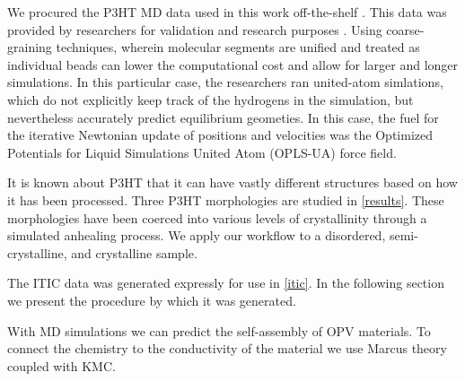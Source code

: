 We procured the P3HT MD data used in this work off-the-shelf \cite{P3HTData}. 
This data was provided by researchers for validation and research purposes \cite{Miller2018}. 
Using coarse-graining techniques, wherein molecular segments are unified and treated as individual beads can lower the computational cost and allow for larger and longer simulations. 
In this particular case, the researchers ran united-atom simlations, which do
not explicitly keep track of the hydrogens in the simulation, but nevertheless accurately predict equilibrium geometies. 
In this case, the fuel for the iterative Newtonian update of positions and velocities was the Optimized Potentials for Liquid Simulations United Atom (OPLS-UA) force field.

It is known about P3HT that it can have vastly different structures based on how it has been processed. 
Three P3HT morphologies are studied in \autoref{results}. These morphologies have been coerced into various levels of crystallinity through a simulated anhealing process. We apply our workflow to a disordered, semi-crystalline, and crystalline sample.

The ITIC data was generated expressly for use in \autoref{itic}. In the following section we present the
procedure by which it was generated. 

With MD simulations we can predict the self-assembly of OPV materials. To connect the chemistry to the
conductivity of the material we use Marcus theory coupled with KMC.


